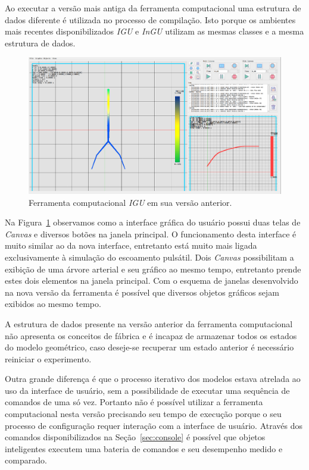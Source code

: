 Ao executar a versão mais antiga da ferramenta computacional uma estrutura de dados diferente é utilizada no processo de compilação. Isto porque os ambientes mais recentes disponibilizados \textit{IGU} e \textit{InGU} utilizam as mesmas classes e a mesma estrutura de dados.


\begin{figure}[!htbp]
	\centering
	\includegraphics[scale=1.2]{Figures/IGU_old2.png}
	\caption{Ferramenta computacional \textit{IGU} em sua versão anterior.}
	\label{fig:IGU-old}
\end{figure}

Na Figura~\ref{fig:IGU-old} observamos como a interface gráfica do usuário possui duas telas de \textit{Canvas} e diversos botões na janela principal. O funcionamento desta interface é muito similar ao da nova interface, entretanto está muito mais ligada exclusivamente à simulação do escoamento pulsátil. Dois \textit{Canvas} possibilitam a exibição de uma árvore arterial e seu gráfico ao mesmo tempo, entretanto prende estes dois elementos na janela principal. Com o esquema de janelas desenvolvido na nova versão da ferramenta é possível que diversos objetos gráficos sejam exibidos ao mesmo tempo.

A estrutura de dados presente na versão anterior da ferramenta computacional não apresenta os conceitos de fábrica e é incapaz de armazenar todos os estados do modelo geométrico, caso deseje-se recuperar um estado anterior é necessário reiniciar o experimento.

Outra grande diferença é que o processo iterativo dos modelos estava atrelada ao uso da interface de usuário, sem a possibilidade de executar uma sequência de comandos de uma só vez. Portanto não é possível utilizar a ferramenta computacional nesta versão precisando seu tempo de execução porque o seu processo de configuração requer interação com a interface de usuário. Através dos comandos disponibilizados na Seção~\ref{sec:console} é possível que objetos inteligentes executem uma bateria de comandos e seu desempenho medido e comparado.

